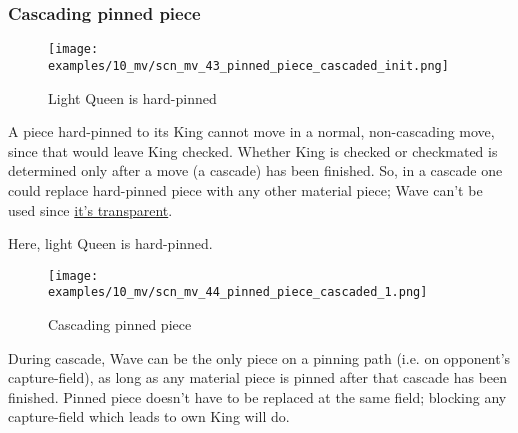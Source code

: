 \clearpage %

\subsubsection*{Cascading pinned piece}
\label{sec:Miranda's veil/Wave/Cascading Waves/Cascading pinned piece}

\vspace*{-1.5\baselineskip}
\noindent
\begin{figure}[!h]
\texttt{[image: examples/10\_mv/scn\_mv\_43\_pinned\_piece\_cascaded\_init.png]}
\vspace*{-1.3\baselineskip}
\caption{Light Queen is hard-pinned}
\label{fig:scn_mv_43_pinned_piece_cascaded_init}
\end{figure}

\vspace*{-0.5\baselineskip}
A piece hard-pinned to its King cannot move in a normal, non-cascading move, since
that would leave King checked. Whether King is checked or checkmated is determined
only after a move (a cascade) has been finished. So, in a cascade one could replace
hard-pinned piece with any other material piece; Wave can't be used since
\hyperref[fig:scn_mv_07_wave_is_transparent]{it's transparent}.

Here, light Queen is hard-pinned.

\clearpage %

\vspace*{-2.1\baselineskip}
\noindent
\begin{figure}[!h]
\texttt{[image: examples/10\_mv/scn\_mv\_44\_pinned\_piece\_cascaded\_1.png]}
\vspace*{-1.3\baselineskip}
\caption{Cascading pinned piece}
\label{fig:scn_mv_44_pinned_piece_cascaded_1}
\end{figure}

\vspace*{-0.5\baselineskip}
During cascade, Wave can be the only piece on a pinning path (i.e. on opponent's
capture-field), as long as any material piece is pinned after that cascade has been
finished. Pinned piece doesn't have to be replaced at the same field; blocking any
capture-field which leads to own King will do.

